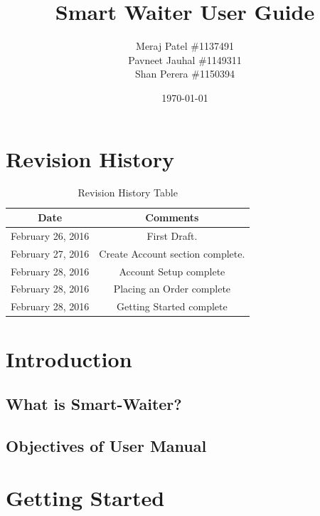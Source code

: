 \documentclass[12pt, titlepage]{article}
\begin{document}
\title{Smart Waiter User Guide} 
\author{Meraj Patel \#1137491 \\ Pavneet Jauhal \#1149311\\ Shan Perera \#1150394}
\date{\today}
\maketitle

\tableofcontents 

\listoffigures

\listoftables

\begin{table}[H]
\section*{Revision History}
\begin{tabular}{|c|c|}
\hline
\textbf{Date}  & \textbf{Comments} \\ \hline
February 26, 2016 &  First Draft. \\ 
\hline
February 27, 2016 & Create Account section complete. \\
\hline
February 28, 2016 & Account Setup complete \\
\hline
February 28, 2016 & Placing an Order complete \\
\hline
February 28, 2016 & Getting Started complete \\
\hline
\end{tabular}
\caption{Revision History Table}
\end{table}

\section{Introduction}
\subsection{What is Smart-Waiter?}
\subsection{Objectives of User Manual}

\section{Getting Started }
\end{document}
